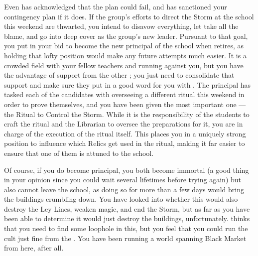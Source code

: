 \documentclass[char]{GL2020}
\begin{document}
Even \cChupLeader{} has acknowledged that the plan could fail, and has sanctioned your contingency plan if it does. If the group’s efforts to direct the Storm at the school this weekend are thwarted, you intend to disavow everything, let \cChupLeader{} take all the blame, and go into deep cover as the group's new leader. Pursuant to that goal, you put in your bid to become the new principal of the school when \cPrincipal{} retires, as holding that lofty position would make any future attempts much easier. It is a crowded field with your fellow teachers \cMusic{\full} and \cBeetle{\full} running against you, but you have the advantage of support from the other \pGoaties{}; you just need to consolidate that support and make sure they put in a good word for you with \cPrincipal{}. The principal has tasked each of the candidates with overseeing a different ritual this weekend in order to prove themselves, and you have been given the most important one — the Ritual to Control the Storm. While it is the responsibility of the students to craft the ritual and the Librarian to oversee the preparations for it, you are in charge of the execution of the ritual itself. This places you in a uniquely strong position to influence which Relics get used in the ritual, making it far easier to ensure that one of them is attuned to the school. 

Of course, if you do become principal, you both become immortal (a good thing in your opinion since you could wait several lifetimes before trying again) but also cannot leave the school, as doing so for more than a few days would bring the buildings crumbling down. You have looked into whether this would also destroy the Ley Lines, weaken magic, and end the Storm, but as far as you have been able to determine it would just destroy the buildings, unfortunately. \cChupLeader{} thinks that you need to find some loophole in this, but you feel that you could run the cult just fine from the \pSchool{}. You have been running a world spanning Black Market from here, after all.  
\end{document}
